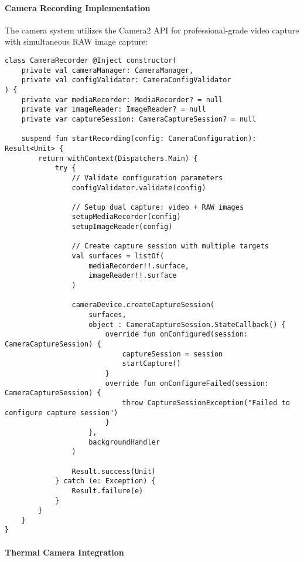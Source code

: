 \documentclass[11pt,a4paper]{report}
\begin{document}
\paragraph{Camera Recording Implementation}

The camera system utilizes the Camera2 API for professional-grade video capture with simultaneous RAW image capture:

\begin{verbatim}
class CameraRecorder @Inject constructor(
    private val cameraManager: CameraManager,
    private val configValidator: CameraConfigValidator
) {
    private var mediaRecorder: MediaRecorder? = null
    private var imageReader: ImageReader? = null
    private var captureSession: CameraCaptureSession? = null

    suspend fun startRecording(config: CameraConfiguration): Result<Unit> {
        return withContext(Dispatchers.Main) {
            try {
                // Validate configuration parameters
                configValidator.validate(config)

                // Setup dual capture: video + RAW images
                setupMediaRecorder(config)
                setupImageReader(config)

                // Create capture session with multiple targets
                val surfaces = listOf(
                    mediaRecorder!!.surface,
                    imageReader!!.surface
                )

                cameraDevice.createCaptureSession(
                    surfaces,
                    object : CameraCaptureSession.StateCallback() {
                        override fun onConfigured(session: CameraCaptureSession) {
                            captureSession = session
                            startCapture()
                        }
                        override fun onConfigureFailed(session: CameraCaptureSession) {
                            throw CaptureSessionException("Failed to configure capture session")
                        }
                    },
                    backgroundHandler
                )

                Result.success(Unit)
            } catch (e: Exception) {
                Result.failure(e)
            }
        }
    }
}
\end{verbatim}

\paragraph{Thermal Camera Integration}
\end{document}
